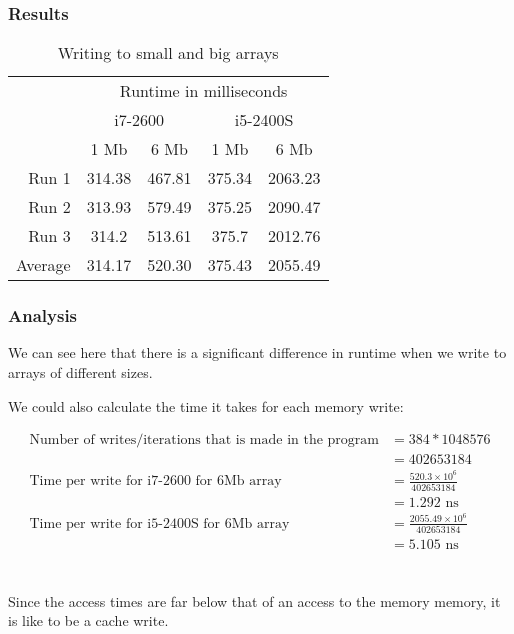 \documentclass{article}
\begin{document}
\subsubsection{Results}
\begin{table}[H]
\centering
\begin{tabular}{r|c|c|c|c|}

\multicolumn{1}{r}{}
 &  \multicolumn{4}{c}{Runtime in milliseconds} \\
 \cline{2-5}
 \multicolumn{1}{r}{}
 &  \multicolumn{2}{c|}{i7-2600} &  \multicolumn{2}{c}{i5-2400S} \\
\cline{2-5}
\multicolumn{1}{c}{}  & \multicolumn{1}{c|}{1 Mb} & \multicolumn{1}{c|}{6 Mb} & \multicolumn{1}{c|}{1 Mb} & \multicolumn{1}{c}{6 Mb}\\
\cline{2-5}
Run 1 & 314.38 & 467.81	& 375.34 & 2063.23\\
\cline{2-5}
Run 2 & 313.93 & 579.49 & 375.25 & 2090.47\\
\cline{2-5}
Run 3 & 314.2 &	513.61	& 375.7 & 2012.76 \\
\cline{2-5}
Average & 314.17 & 520.30 & 375.43 & 2055.49 \\
\cline{2-5}
\end{tabular}
 \caption{Writing to small and big arrays}
 \label{tab:writepolicy}
\end{table}

\subsubsection{Analysis}
We can see here that there is a significant difference in runtime when we write to arrays of different sizes. 

We could also calculate the time it takes for each memory write:

\begin{align*}
\text{Number of writes/iterations that is made in the program} &= 384 * 1048576 \\
&= 402653184 \\
\text{Time per write for i7-2600 for 6Mb array} &= \frac{520.3 \times 10^6}{402653184} \\
&= 1.292 \text{ ns} \\
\text{Time per write for i5-2400S for 6Mb array} &= \frac{2055.49 \times 10^6}{402653184} \\
&= 5.105 \text{ ns} \\
\end{align*} 

Since the access times are far below that of an access to the memory memory, it is like to be a cache write.
\end{document}
